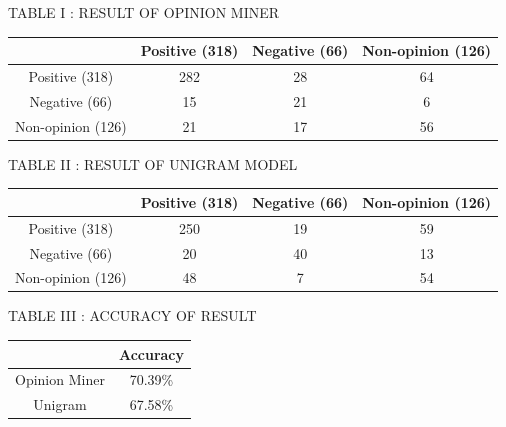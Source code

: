 \documentclass[a4paper,12pt]{article}
\begin{document}
\begin{center}
TABLE I : RESULT OF OPINION MINER 
\linebreak \linebreak
\begin{tabular}{|c|c|c|c|}
\hline
& Positive (318) & Negative (66) & Non-opinion (126) \\
\hline
Positive (318) & 282 & 28 & 64  \\
\hline
Negative (66) & 15 & 21 & 6 \\
\hline
Non-opinion (126) & 21 & 17 & 56 \\ 
\hline
\end{tabular}
\linebreak \linebreak \linebreak
\par TABLE II : RESULT OF UNIGRAM MODEL 
\linebreak \linebreak
\begin{tabular}{|c|c|c|c|}
\hline
& Positive (318) & Negative (66) & Non-opinion (126) \\
\hline
Positive (318) & 250 & 19 & 59  \\
\hline
Negative (66) & 20 & 40 & 13 \\
\hline
Non-opinion (126) & 48 & 7 & 54 \\ 
\hline
\end{tabular}
\linebreak \linebreak \linebreak
\par TABLE III : ACCURACY OF RESULT 
\linebreak \linebreak
\begin{tabular}{|c|c|}
\hline
& Accuracy\\
\hline
Opinion Miner & 70.39\%  \\
\hline
Unigram & 67.58\% \\
\hline
\end{tabular}
\end{center}

\newpage
{}
\newpage
\end{document}
